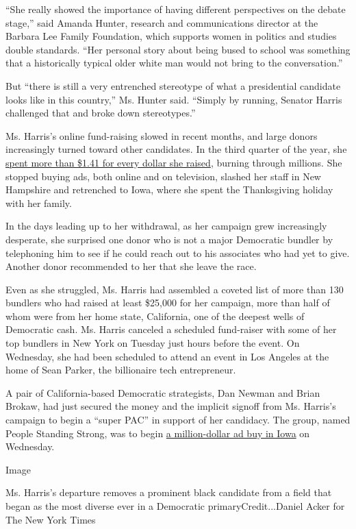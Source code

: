 ``She really showed the importance of having different perspectives on
the debate stage,'' said Amanda Hunter, research and communications
director at the Barbara Lee Family Foundation, which supports women in
politics and studies double standards. ``Her personal story about being
bused to school was something that a historically typical older white
man would not bring to the conversation.''

But ``there is still a very entrenched stereotype of what a presidential
candidate looks like in this country,'' Ms. Hunter said. ``Simply by
running, Senator Harris challenged that and broke down stereotypes.''

Ms. Harris's online fund-raising slowed in recent months, and large
donors increasingly turned toward other candidates. In the third quarter
of the year, she
\href{https://www.nytimes.com/interactive/2019/10/16/us/elections/democratic-q3-fundraising.html}{spent
more than \$1.41 for every dollar she raised}, burning through millions.
She stopped buying ads, both online and on television, slashed her staff
in New Hampshire and retrenched to Iowa, where she spent the
Thanksgiving holiday with her family.

In the days leading up to her withdrawal, as her campaign grew
increasingly desperate, she surprised one donor who is not a major
Democratic bundler by telephoning him to see if he could reach out to
his associates who had yet to give. Another donor recommended to her
that she leave the race.

Even as she struggled, Ms. Harris had assembled a coveted list of more
than 130 bundlers who had raised at least \$25,000 for her campaign,
more than half of whom were from her home state, California, one of the
deepest wells of Democratic cash. Ms. Harris canceled a scheduled
fund-raiser with some of her top bundlers in New York on Tuesday just
hours before the event. On Wednesday, she had been scheduled to attend
an event in Los Angeles at the home of Sean Parker, the billionaire tech
entrepreneur.

A pair of California-based Democratic strategists, Dan Newman and Brian
Brokaw, had just secured the money and the implicit signoff from Ms.
Harris's campaign to begin a ``super PAC'' in support of her candidacy.
The group, named People Standing Strong, was to begin
\href{https://m.youtube.com/watch?v=8YPgUVrEFsU\&feature=youtu.be}{a
million-dollar ad buy in Iowa} on Wednesday.

Image

Ms. Harris's departure removes a prominent black candidate from a field
that began as the most diverse ever in a Democratic
primaryCredit...Daniel Acker for The New York Times

